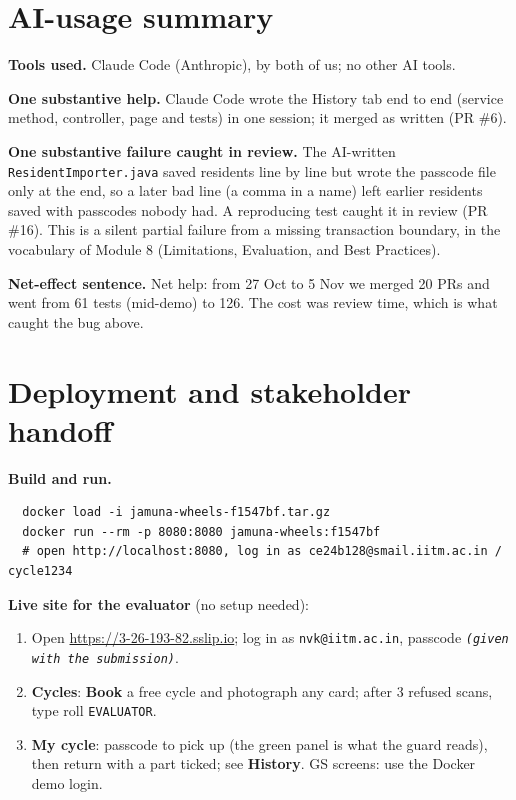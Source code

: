 \documentclass[11pt,a4paper]{article}
\newcommand{\evalpass}{\textit{(given with the submission)}}
\begin{document}
\section{AI-usage summary}

\textbf{Tools used.} Claude Code (Anthropic), by both of us; no other AI tools.

\textbf{One substantive help.} Claude Code wrote the History tab end to end (service method, controller, page and tests) in one session; it merged as written (PR \#6).

\textbf{One substantive failure caught in review.} The AI-written \texttt{ResidentImporter.java} saved residents line by line but wrote the passcode file only at the end, so a later bad line (a comma in a name) left earlier residents saved with passcodes nobody had. A reproducing test caught it in review (PR \#16). This is a silent partial failure from a missing transaction boundary, in the vocabulary of Module 8 (Limitations, Evaluation, and Best Practices).

\textbf{Net-effect sentence.} Net help: from 27 Oct to 5 Nov we merged 20 PRs and went from 61 tests (mid-demo) to 126. The cost was review time, which is what caught the bug above.

\section{Deployment and stakeholder handoff}

\textbf{Build and run.}
\begin{verbatim}
  docker load -i jamuna-wheels-f1547bf.tar.gz
  docker run --rm -p 8080:8080 jamuna-wheels:f1547bf
  # open http://localhost:8080, log in as ce24b128@smail.iitm.ac.in / cycle1234
\end{verbatim}

\textbf{Live site for the evaluator} (no setup needed):
\begin{enumerate}[leftmargin=*,nosep]
  \item Open \url{https://3-26-193-82.sslip.io}; log in as \texttt{nvk@iitm.ac.in}, passcode \texttt{\evalpass}.
  \item \textbf{Cycles}: \textbf{Book} a free cycle and photograph any card; after 3 refused scans, type roll \texttt{EVALUATOR}.
  \item \textbf{My cycle}: passcode to pick up (the green panel is what the guard reads), then return with a part ticked; see \textbf{History}. GS screens: use the Docker demo login.
\end{enumerate}
\end{document}
